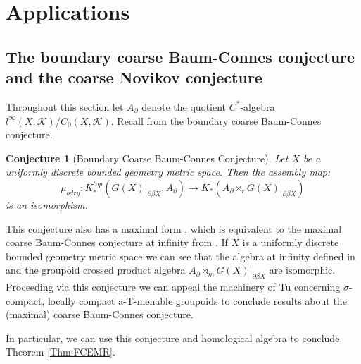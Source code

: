 \documentclass[preprint]{elsarticle}
\theoremstyle{plain}
\newtheorem*{conjecture1}{Conjecture}
\theoremstyle{definition}%
\theoremstyle{remark}%
\begin{document}
\section{Applications}\label{sect:apps}

\subsection{The boundary coarse Baum-Connes conjecture and the coarse Novikov conjecture}\label{Sect:apps}
Throughout this section let $A_{\partial}$ denote the quotient $C^{*}$-algebra $l^{\infty}(X,\mathcal{K})/C_{0}(X,\mathcal{K})$. Recall from \cite{mypub1} the boundary coarse Baum-Connes conjecture.
\begin{conjecture1} [Boundary Coarse Baum-Connes Conjecture]
Let $X$ be a uniformly discrete bounded geometry metric space. Then the assembly map:
\begin{equation*}
\mu_{bdry}:K_{*}^{top}(G(X)|_{\partial\beta X}, A_{\partial}) \rightarrow K_{*}(A_{\partial}\rtimes_{r}G(X)|_{\partial\beta X})
\end{equation*}
is an isomorphism.
\end{conjecture1}

This conjecture also has a maximal form \cite[Section 4]{mypub1}, which is equivalent to the maximal coarse Baum-Connes conjecture at infinity from \cite{FCEpaper}. If $X$ is a uniformly discrete bounded geometry metric space we can see that the algebra at infinity defined in \cite{FCEpaper} and the groupoid crossed product algebra $A_{\partial}\rtimes_{m}G(X)|_{\partial\beta X}$ are isomorphic. Proceeding via this conjecture we can appeal the machinery of Tu \cite{MR1703305} concerning $\sigma$-compact, locally compact a-T-menable groupoids to conclude results about the (maximal) coarse Baum-Connes conjecture. 

In particular, we can use this conjecture and homological algebra to conclude Theorem \ref{Thm:FCEMR}.
\end{document}
